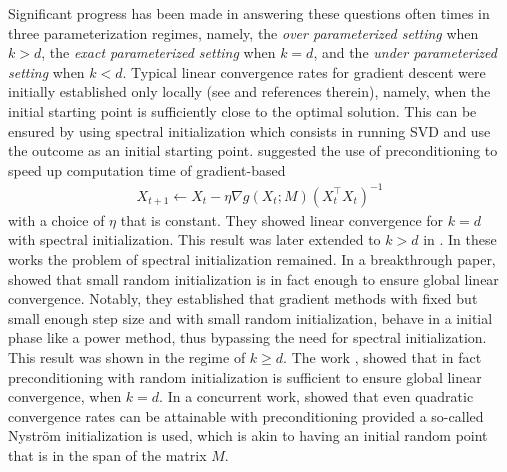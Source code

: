 Significant progress has been made in answering these questions often times in three parameterization regimes, namely, the \emph{over parameterized setting} when $k > d$, the \emph{exact parameterized setting} when $k = d$, and the \emph{under parameterized setting} when $k < d$. Typical linear convergence rates for gradient descent were initially established only locally (see \cite{du2018algorithmic, chi2019nonconvex} and references therein), namely, when the initial starting point is sufficiently close to the optimal solution. This can be ensured by using spectral initialization which consists in running SVD and use the outcome as an initial starting point. \cite{tong2021accelerating} suggested the use of preconditioning to speed up computation time of gradient-based 
\begin{align}
        X_{t+1} \gets X_t - \eta \nabla g(X_t; M) (X_t^\top X_t)^{-1}
\end{align}
with a choice of $\eta$ that is constant. They showed linear convergence for $k = d$ with spectral initialization. This result was later extended to $k > d$ in \cite{zhang2023preconditioned}. In these works the problem of spectral initialization remained. In a breakthrough paper, \cite{stoger2021small} showed that small random initialization is in fact enough to ensure global linear convergence. Notably, they established that gradient methods with fixed but small enough step size and with small random initialization, behave in a initial phase like a power method, thus bypassing the need for spectral initialization. This result was shown in the regime of $k \ge d$. The work \cite{jia2024preconditioning}, showed that in fact preconditioning with random initialization is sufficient to ensure global linear convergence, when $k = d$. In a concurrent work, \citet{li2024crucial}  showed that even quadratic convergence rates can be attainable with preconditioning provided a so-called Nyström initialization is used, which is akin to having an initial random point that is in the span of the matrix $M$. 

